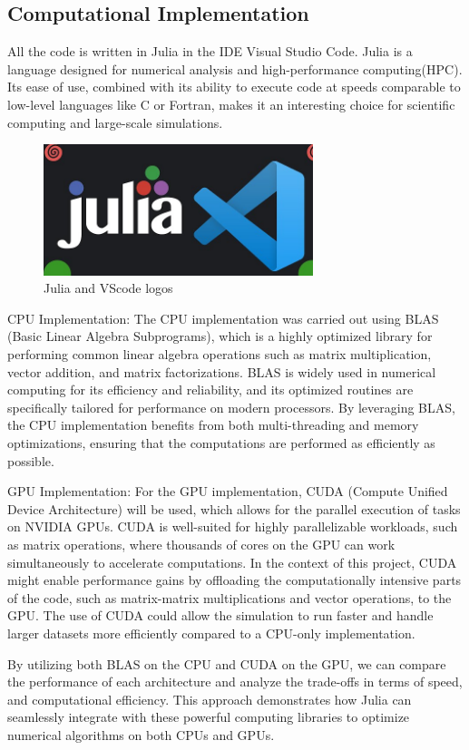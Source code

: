 \clearpage


\subsection{ Computational Implementation}
All the code is written in Julia in the IDE Visual Studio Code. Julia is a language designed for numerical analysis and high-performance computing(HPC). Its ease of use, combined with its ability to execute code at speeds comparable to low-level languages like C or Fortran, makes it an interesting choice for scientific computing and large-scale simulations.


\begin{figure}[H]
    \centering
    \includegraphics[width=0.7\textwidth]{Figures/jvs.png}
    \caption{Julia and VScode logos}
    \label{fig:etiqueta_figure}
\end{figure}



CPU Implementation:
The CPU implementation was carried out using BLAS (Basic Linear Algebra Subprograms), which is a highly optimized library for performing common linear algebra operations such as matrix multiplication, vector addition, and matrix factorizations. BLAS is widely used in numerical computing for its efficiency and reliability, and its optimized routines are specifically tailored for performance on modern processors. By leveraging BLAS, the CPU implementation benefits from both multi-threading and memory optimizations, ensuring that the computations are performed as efficiently as possible.

GPU Implementation:
For the GPU implementation, CUDA (Compute Unified Device Architecture) will be used, which allows for the parallel execution of tasks on NVIDIA GPUs. CUDA is well-suited for highly parallelizable workloads, such as matrix operations, where thousands of cores on the GPU can work simultaneously to accelerate computations. In the context of this project, CUDA might enable performance gains by offloading the computationally intensive parts of the code, such as matrix-matrix multiplications and vector operations, to the GPU. The use of CUDA could allow the simulation to run faster and handle larger datasets more efficiently compared to a CPU-only implementation.

By utilizing both BLAS on the CPU and CUDA on the GPU, we can compare the performance of each architecture and analyze the trade-offs in terms of speed, and computational efficiency. This approach demonstrates how Julia can seamlessly integrate with these powerful computing libraries to optimize numerical algorithms on both CPUs and GPUs.







